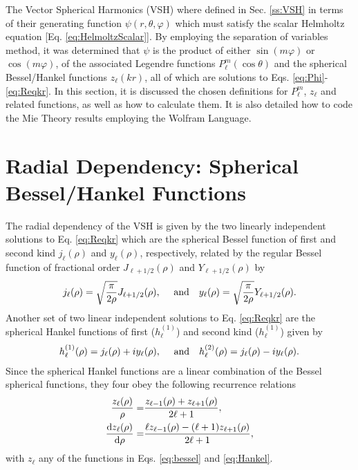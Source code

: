 
The Vector Spherical Harmonics (VSH) where defined in Sec. \ref{ss:VSH} in terms of their generating function $\psi(r,\theta,\varphi)$ which must satisfy the scalar Helmholtz equation [Eq.  \eqref{eq:HelmoltzScalar}]. By employing the separation of variables method,  it was determined that $\psi$ is the product of either $\sin(m\varphi)$ or $\cos(m\varphi)$, of the associated Legendre functions $P_\ell^m(\cos\theta)$ and the spherical Bessel/Hankel functions $z_\ell(kr)$, all of which are solutions to Eqs. \eqref{eq:Phi}-\eqref{eq:Reqkr}. In this section, it is discussed the chosen definitions for $P_\ell^m$, $z_\ell$ and related functions, as well as how to calculate them. It is also detailed how to code the Mie Theory results employing the Wolfram Language.

\section*{Radial Dependency: Spherical Bessel/Hankel Functions}

The radial dependency of the VSH is given by the two linearly independent solutions to Eq. \eqref{eq:Reqkr} which are the spherical Bessel function of first and second kind $j_\ell(\rho)$ and $y_\ell(\rho)$, respectively, related by the regular Bessel function of fractional order $J_{\ell+1/2}(\rho)$ and  $Y_{\ell+1/2}(\rho)$ by
%
\begin{align}
j_\ell(\rho) = \sqrt{\frac{\pi}{2 \rho}}J_{\ell+1/2}(\rho),\qqtext{ and}
y_\ell(\rho) = \sqrt{\frac{\pi}{2\rho}}Y_{\ell+1/2}(\rho).
\label{eq:bessel}
\end{align}
%
Another set of two linear independent solutions to  Eq. \eqref{eq:Reqkr} are the spherical Hankel functions  of first ($h^{(1)}_\ell$)  and second kind ($h^{(1)}_\ell$) given by
\begin{align}
h^{(1)}_\ell(\rho) = j_\ell(\rho) + i y_\ell(\rho),\qqtext{ and}
h^{(2)}_\ell(\rho) = j_\ell(\rho) - i y_\ell(\rho).
\label{eq:Hankel}
\end{align}
%
Since the spherical Hankel functions are a linear combination of the Bessel spherical functions, they four obey the following recurrence relations
%
\begin{align}
\frac{z_\ell(\rho)}{\rho} =& \frac{z_{\ell-1}(\rho) + z_{\ell+1}(\rho)}{2\ell + 1},
\label{eq:recBessel1}\\
\dv{z_\ell(\rho)}{\rho} =& \frac{\ell z_{\ell-1}(\rho) - (\ell+1)z_{\ell+1}(\rho)}{2\ell + 1} ,
\label{eq:recBessel2}
\end{align}
%
with $z_\ell$ any of the functions in Eqs. \eqref{eq:bessel} and \eqref{eq:Hankel}.



